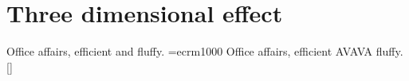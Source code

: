 \documentclass{amsart}
\begin{document}
\section{Three dimensional effect}
Office affairs, efficient and fluffy.
\font\nl=ecrm1000 \pdfnoligatures\nl
{\nl Office affairs, efficient AVAVA fluffy.} [\the\pdfnoligatures\nl]
\end{document}
